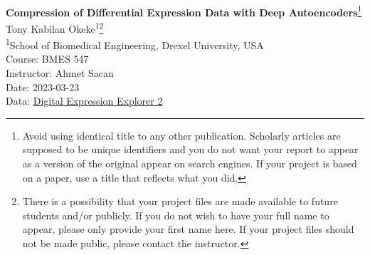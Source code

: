 \documentclass[11pt]{article}
\begin{document}
\begin{flushleft}
    \hrulefill\\
    {\large\textbf{Compression of Differential Expression Data with Deep Autoencoders}\footnote[1]{  Avoid using identical title to any other publication. Scholarly articles are supposed to be unique identifiers and you do not want your report to appear as a version of the original appear on search engines. If your project is based on a paper, use a title that reflects what you did.}}\\
    Tony Kabilan Okeke\textsuperscript{1}\footnote[2]{There is a possibility that your project files are made available to future students and/or publicly. If you do not wish to have your full name to appear, please only provide your first name here. If your project files should not be made public, please contact the instructor.}\\
    \textsuperscript{1}School of Biomedical Engineering, Drexel University, USA\\
    \vspace{1em}
    Course: BMES 547\\
    Instructor: Ahmet Sacan\\
    Date: 2023-03-23\\
    Data: \href{https://dee2.io/}{Digital Expression Explorer 2} \\
    \hrulefill
\end{flushleft}


\begin{multicols*}{2}
    \raggedcolumns

    
    \vspace{1em}

    
    \vspace{1em}

    
    \vspace{1em}

    
    \vspace{1em}

    
    \vspace{1em}

    
    \vspace{1em}

    
    

    \balance
\end{multicols*}
\end{document}
